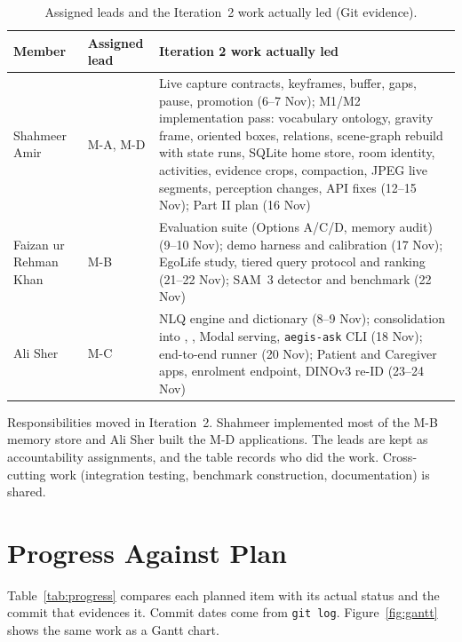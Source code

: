 \begin{table}[H]
\centering\footnotesize
\caption{Assigned leads and the Iteration~2 work actually led (Git evidence).}
\label{tab:wbs}
\begin{tabularx}{\textwidth}{@{}L{2.4cm} L{1.6cm} Y@{}}
\toprule
{}\textbf{Member} & \textbf{Assigned lead} & \textbf{Iteration 2 work actually led}\\
\midrule
Shahmeer Amir & M-A, M-D & Live capture contracts, keyframes, buffer, gaps, pause, promotion (6--7 Nov); M1/M2 implementation pass: vocabulary ontology, gravity frame, oriented boxes, relations, scene-graph rebuild with state runs, SQLite home store, room identity, activities, evidence crops, compaction, JPEG live segments, perception changes, API fixes (12--15 Nov); Part II plan (16 Nov)\\
Faizan ur Rehman Khan & M-B & Evaluation suite (Options A/C/D, memory audit) (9--10 Nov); demo harness and calibration (17 Nov); EgoLife study, tiered query protocol and ranking (21--22 Nov); SAM~3 detector and benchmark (22 Nov)\\
Ali Sher & M-C & NLQ engine and dictionary (8--9 Nov); consolidation into , , Modal serving, \texttt{aegis-ask} CLI (18 Nov); end-to-end runner (20 Nov); Patient and Caregiver apps, enrolment endpoint, DINOv3 re-ID (23--24 Nov)\\
\bottomrule
\end{tabularx}
\end{table}

Responsibilities moved in Iteration~2. Shahmeer implemented most of the M-B
memory store and Ali Sher built the M-D applications. The leads are kept as
accountability assignments, and the table records who did the work.
 Cross-cutting work
(integration testing, benchmark construction, documentation) is shared.

\section{Progress Against Plan}
Table~\ref{tab:progress} compares each planned item with its actual status and
the commit that evidences it. Commit dates come from \texttt{git log}.
 Figure~\ref{fig:gantt} shows the same work as a Gantt chart.

